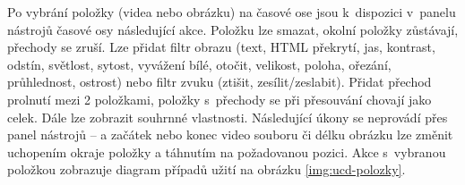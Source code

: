 Po vybrání položky (videa nebo obrázku) na časové ose jsou k~dispozici v~panelu nástrojů časové osy následující akce. Položku lze smazat, okolní položky zůstávají, přechody se zruší. Lze přidat filtr obrazu (text, HTML překrytí, jas, kontrast, odstín, světlost, sytost, vyvážení bílé, otočit, velikost, poloha, ořezání, průhlednost, ostrost) nebo filtr zvuku (ztišit, zesílit/zeslabit). Přidat přechod prolnutí mezi 2 položkami, položky s~přechody se při přesouvání chovají jako celek. Dále lze zobrazit souhrnné vlastnosti. Následující úkony se neprovádí přes panel nástrojů --  a začátek nebo konec video souboru či délku obrázku lze změnit uchopením okraje položky a táhnutím na požadovanou pozici. Akce s~vybranou položkou zobrazuje diagram případů užití na obrázku \ref{img:ucd-polozky}.
